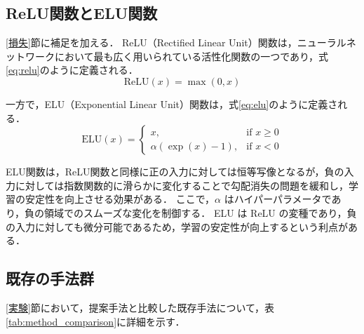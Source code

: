 \documentclass[dvipdfmx]{jreport}
\begin{document}
\newpage

\subsection{ReLU関数とELU関数}
\ref{損失}節に補足を加える．
ReLU（Rectified Linear Unit）関数は，ニューラルネットワークにおいて最も広く用いられている活性化関数の一つであり，式\eqref{eq:relu}のように定義される．
\begin{equation}
\mathrm{ReLU}(x) = \max(0, x) \label{eq:relu}
\end{equation}

一方で，ELU（Exponential Linear Unit）関数は，式\eqref{eq:elu}のように定義される．
\begin{equation}
\mathrm{ELU}(x) =
\begin{cases}
x, & \text{if } x \geq 0 \\
\alpha (\exp(x) - 1), & \text{if } x < 0
\end{cases}
\label{eq:elu}
\end{equation}

ELU関数は，ReLU関数と同様に正の入力に対しては恒等写像となるが，負の入力に対しては指数関数的に滑らかに変化することで勾配消失の問題を緩和し，学習の安定性を向上させる効果がある．
ここで，$\alpha$ はハイパーパラメータであり，負の領域でのスムーズな変化を制御する．
ELU は ReLU の変種であり，負の入力に対しても微分可能であるため，学習の安定性が向上するという利点がある．

\newpage

\subsection{既存の手法群}
\ref{実験}節において，提案手法と比較した既存手法について，表\ref{tab:method_comparison}に詳細を示す．
\end{document}
